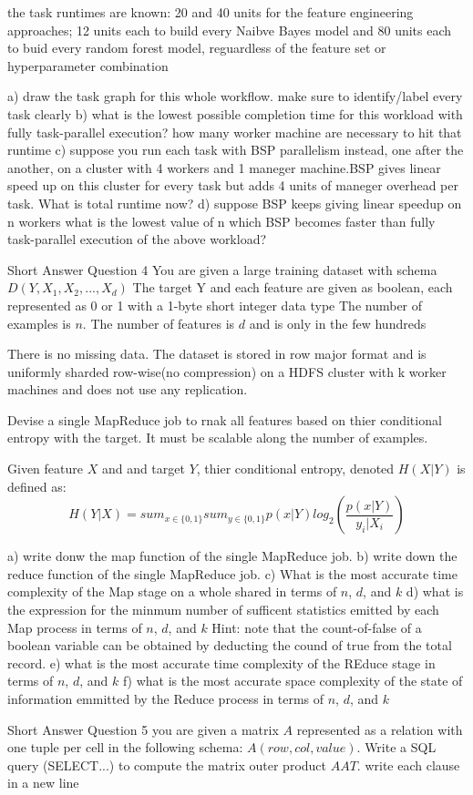 the task runtimes are known: 20 and 40 units for the feature engineering approaches; 12 units each to build every Naibve Bayes model and 80 units each to buid every random forest model, reguardless of the feature set or hyperparameter combination

a) draw the task graph for this whole workflow. make sure to identify/label every task clearly
b) what is the lowest possible completion time for this workload with fully task-parallel execution? how many worker machine are necessary to hit that runtime
c) suppose you run each task with BSP parallelism instead, one after the another, on a cluster with 4 workers and 1 maneger machine.BSP gives linear speed up on this cluster for every task but adds 4 units of maneger overhead per task. What is total runtime now?
d) suppose BSP keeps giving linear speedup on n workers what is the lowest value of n which BSP becomes faster than fully task-parallel execution of the above workload?


Short Answer Question 4
You are given a large training dataset with schema $D(Y,X_1,X_2,...,X_d)$
The target Y and each feature are given as boolean, each represented as 0 or 1 with a 1-byte short integer data type
The number of examples is $n$. The number of features is $d$ and is only in the few hundreds

There is no missing data. The dataset is stored in row major format and is uniformly sharded row-wise(no compression) on
a HDFS cluster with k worker machines and does not use any replication.

Devise a single MapReduce job to rnak all features based on thier conditional entropy with the target. 
It must be scalable along the number of examples. 

Given feature $X$ and and target $Y$, thier conditional entropy, denoted $H(X|Y)$ is defined as:
$$H(Y|X) = sum_{x\in \{0,1\}} sum_{y\in \{0,1\}}p(x|Y) log_2 (\frac{p(x|Y)}{y_i|X_i})$$

a) write donw the map function of the single MapReduce job. 
b) write down the reduce function of the single MapReduce job.
c) What is the most accurate time complexity of the Map stage on a whole shared in terms of $n$, $d$, and $k$
d) what is the expression for the minmum number of sufficent statistics emitted by each Map process in terms of $n$, $d$, and $k$
    Hint: note that the count-of-false of a boolean variable can be obtained by deducting the cound of true from the total record.
e) what is the most accurate time complexity of the REduce stage in terms of $n$, $d$, and $k$
f) what is the most accurate space complexity of the state of information emmitted by the Reduce process in terms of $n$, $d$, and $k$


Short Answer Question 5
you are given a matrix $A$ represented as a relation with one tuple per cell in the following schema:
$A(row, col, value)$. Write a SQL query (SELECT...) to compute the matrix outer product $AAT$. write each clause in a new line
